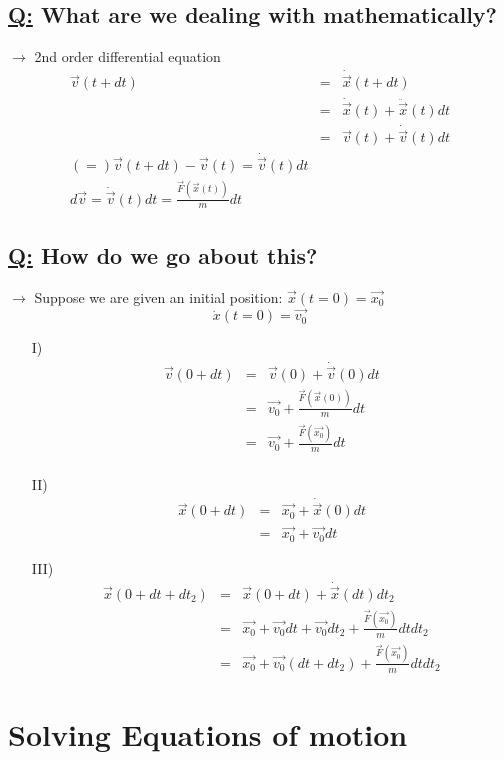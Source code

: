 \documentclass[a4paper, 12pt]{article}
\begin{document}
\subsection{\underline{Q:} What are we dealing with mathematically?}
$\rightarrow$ 2nd order differential equation
\begin{eqnarray*}
\vec{v}(t+dt) &=& \dot{\vec{x}}(t+dt)\\
&=& \dot{\vec{x}}(t) + \ddot{\vec{x}}(t)dt\\
&=& \vec{v}(t) + \dot{\vec{v}}(t)dt\\
(=) \vec{v}(t+dt) - \vec{v}(t) = \dot{\vec{v}}(t)dt\\
d\vec{v} = \dot{\vec{v}}(t)dt = \frac{\vec{F}(\vec{x}(t))}{m}dt
\end{eqnarray*} 
\subsection{\underline{Q:} How do we go about this?}
$\rightarrow$ Suppose we are given an initial position: $\vec{x}(t=0)=\vec{x_0}$
$$\dot{x}(t=0) = \vec{v_0}$$
\begin{enumerate}
\item[I)] \begin{eqnarray*}
\vec{v}(0+dt) &=& \vec{v}(0) + \dot{\vec{v}}(0)dt\\
&=& \vec{v_0} + \frac{\vec{F}(\vec{x}(0))}{m}dt\\
&=& \vec{v_0} + \frac{\vec{F}(\vec{x_0})}{m}dt\\
\end{eqnarray*}
\item[II)] \begin{eqnarray*}
\vec{x}(0+dt) &=& \vec{x_0} + \dot{\vec{x}}(0)dt\\
&=& \vec{x_0} + \vec{v_0}dt
\end{eqnarray*}
\item[III)] \begin{eqnarray*}
\vec{x}(0+dt+dt_2) &=& \vec{x}(0+dt) + \dot{\vec{x}}(dt)dt_2\\
&=& \vec{x_0} + \vec{v_0}dt+\vec{v_0}dt_2 + \frac{\vec{F}(\vec{x_0})}{m}dt dt_2\\
&=& \vec{x_0} + \vec{v_0}(dt+ dt_2) + \frac{\vec{F}(\vec{x_0})}{m}dt dt_2
\end{eqnarray*}
\end{enumerate}

\section{Solving Equations of motion}
\end{document}
